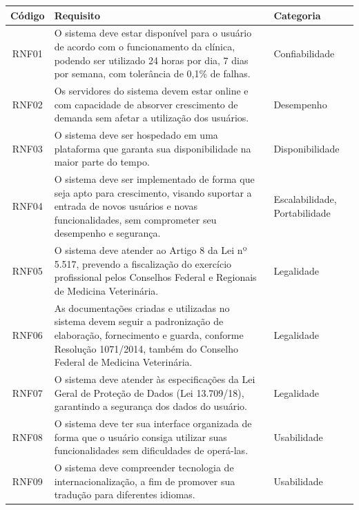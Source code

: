 \documentclass[
    12pt,               %
    openright,          %
    oneside,
    a4paper,            %
    BIBLATEX,           %
    TODO,               %
    english,            %
    brazil              %
    ]{ifsp-spo-inf-ctds}
\begin{document}
            \begin{center}
                \begin{table}[h]
                \begin{tabulary}{1.0\textwidth}{|C|p{25em}|p{7em}|}
                \hline
                Código & Requisito & Categoria\\
                \hline
                RNF01 & O sistema deve estar disponível para o usuário de acordo com o funcionamento da clínica, podendo ser utilizado 24 horas por dia, 7 dias por semana, com tolerância de 0,1\% de falhas. & Confiabilidade\\
                \hline
                RNF02 & Os servidores do sistema devem estar online e com capacidade de absorver crescimento de demanda sem afetar a utilização dos usuários. & Desempenho\\
                \hline
                RNF03 & O sistema deve ser hospedado em uma plataforma que garanta sua disponibilidade na maior parte do tempo. & Disponibilidade\\
                \hline
                RNF04 & O sistema deve ser implementado de forma que seja apto para crescimento, visando suportar a entrada de novos usuários e novas funcionalidades, sem comprometer seu desempenho e segurança. & Escalabilidade, Portabilidade\\
                \hline
                RNF05 & O sistema deve atender ao Artigo 8 da Lei nº 5.517, prevendo a fiscalização do exercício profissional pelos Conselhos Federal e Regionais de Medicina Veterinária. & Legalidade\\
                \hline
                RNF06 & As documentações criadas e utilizadas no sistema devem seguir a padronização de elaboração, fornecimento e guarda, conforme Resolução 1071/2014, também do Conselho Federal de Medicina Veterinária. & Legalidade\\
                \hline
                RNF07 & O sistema deve atender às especificações da Lei Geral de Proteção de Dados (Lei 13.709/18), garantindo a segurança dos dados do usuário. & Legalidade\\
                \hline
                RNF08 & O sistema deve ter sua interface organizada de forma que o usuário consiga utilizar suas funcionalidades sem dificuldades de operá-las. & Usabilidade\\
                \hline
                RNF09 & O sistema deve compreender tecnologia de internacionalização, a fim de promover sua tradução para diferentes idiomas. & Usabilidade\\

\end{tabulary}
\end{table}
\end{center}
\end{document}
